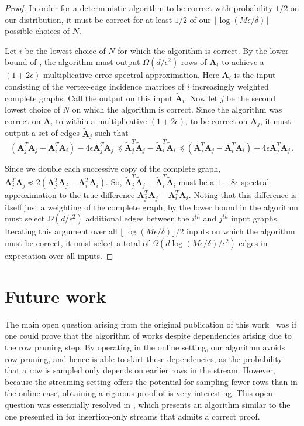 \documentclass{toc}
\newcommand{\bv}[1]{\mathbf{#1}}
\begin{document}
\begin{proof}
In order for a deterministic algorithm to be correct with probability $1/2$ on our distribution, it must be correct for at least $1/2$ of our $\lfloor \log(M\epsilon/\delta) \rfloor$ possible choices of $N$.

Let $i$ be the lowest choice of $N$ for which the algorithm is correct. By the lower bound of \cite{batson2012twice}, the algorithm must output  $\Omega(d/\epsilon^2)$ rows of $\bv{A}_i$ to achieve a $(1+2\epsilon)$ multiplicative-error spectral approximation. Here $\bv{A}_i$ is the input consisting of the vertex-edge incidence matrices of $i$ increasingly weighted complete graphs. Call the output on this input $\bv{\tilde A}_i$.
Now let $j$ be the second lowest choice of $N$ on which the algorithm is correct. Since the algorithm was correct on $\bv{A}_i$ to within a multiplicative $(1+2\epsilon)$, to be correct on $\bv{A}_j$, 
it must output a set of edges $\bv{\tilde A}_j$ such that 
$$
(\bv{A}_j^T \bv{A}_j- \bv{A}_i^T \bv{A}_i) - 4 \epsilon \bv{A}_j^T \bv{A}_j \preceq \bv{\tilde A}_j^T\bv{\tilde A}_j - \bv{\tilde A}_i^T\bv{\tilde A}_i \preceq (\bv{A}_j^T \bv{A}_j- \bv{A}_i^T \bv{A}_i) + 4 \epsilon \bv{A}_j^T \bv{A}_j\,.
$$

Since we double each successive copy of the complete graph, $\bv{A}_j^T \bv{A}_j \preceq 2(\bv{A}_j^T \bv{A}_j- \bv{A}_i^T \bv{A}_i)$. So, $\bv{\tilde A}_j^T\bv{\tilde A}_j - \bv{\tilde A}_i^T\bv{\tilde A}_i$ must be a $1+8\epsilon$ spectral approximation to the true difference $\bv{A}_j^T \bv{A}_j - \bv{A}_i^T \bv{A}_i$. Noting that this difference is itself just a weighting of the complete graph, by the lower bound in \cite{batson2012twice} the algorithm must select $\Omega(d/\epsilon^2)$ additional edges between the $i^{th}$ and $j^{th}$ input graphs. Iterating this argument over all $\lfloor \log(M\epsilon/\delta) \rfloor/2$ inputs on which the algorithm must be correct, it must select a total of $\Omega(d\log(M\epsilon/\delta)/\epsilon^2)$ edges in expectation over all inputs. 
\end{proof}

\section{Future work}

The main open question arising from the original publication of this
work~\cite{conf-version}
was if one could prove that the algorithm of \cite{kelner2013spectral} works despite dependencies arising due to the row pruning step. By operating in the online setting, our algorithm avoids row pruning, and hence is able to skirt these dependencies, as the probability that a row is sampled only depends on earlier rows in the stream. However, because the streaming setting offers the potential for sampling fewer rows than in the online case, obtaining a rigorous proof of \cite{kelner2013spectral} is very interesting. This open question was essentially resolved in %
\cite{kyng2017framework}, which presents
%
an algorithm similar to the one presented in  %
\cite{kelner2013spectral} 
for insertion-only streams that admits a correct proof.
%
%
\end{document}
